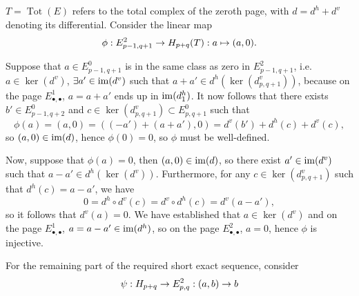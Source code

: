 \subsection{}
$T=\operatorname{Tot}(E)$ refers to the total complex of the zeroth page, with $d=d^h+d^v$ denoting its differential. Consider the linear map 
\[\phi:E^2_{p-1,q+1}\rightarrow H_{p+q}(T):a\mapsto(a,0).\]

Suppose that $a\in E^0_{p-1,q+1}$ is in the same class as zero in $E^2_{p-1,q+1}$, i.e. $a\in\ker(d^v)$, $\exists a'\in\operatorname{\operatorname{im}}(d^v)$ such that $a+a'\in d^h(\ker(d^v_{p,q+1}))$, because on the page $E^1_{\bullet,\bullet}$, $a=a+a'$ ends up in $\operatorname{\operatorname{im}}(d^h_1)$.
It now follows that there exists $b'\in E^0_{p-1,q+2}$ and $c\in\ker(d^v_{p,q+1})\subset E^0_{p,q+1}$ such that
\[\phi(a)=(a,0)=((-a')+(a+a'),0)=d^v(b')+d^h(c)+d^v(c),\]
so $(a,0)\in\operatorname{\operatorname{im}}(d)$, hence $\phi(0)=0$, so $\phi$ must be well-defined.

Now, suppose that $\phi(a)=0$, then $(a,0)\in\operatorname{\operatorname{im}}(d)$, so there exist $a'\in\operatorname{\operatorname{im}}(d^v)$ such that $a-a'\in d^h(\ker(d^v))$. Furthermore, for any $c\in\ker(d^v_{p,q+1})$ such that $d^h(c)=a-a'$, we have
\[0=d^h\circ d^v(c)=d^v\circ d^h(c)=d^v(a-a'),\]
so it follows that $d^v(a)=0$. We have established that $a\in\ker(d^v)$ and on the page $E^1_{\bullet,\bullet}$, $a=a-a'\in\operatorname{\operatorname{im}}(d^h)$, so on the page $E^2_{\bullet,\bullet}$, $a=0$, hence $\phi$ is injective.

For the remaining part of the required short exact sequence, consider
\[\psi:H_{p+q}\rightarrow E^2_{p,q}:(a,b)\rightarrow b\]
